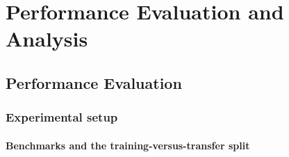 %
%

\chapter{Performance Evaluation and Analysis}
\label{ch:evaluation}


\section{Performance Evaluation}
\label{sec:performance}

\subsection{Experimental setup}
\label{sec:setup}

\subsubsection{Benchmarks and the training-versus-transfer split}
\label{sec:setup-benchmarks}

